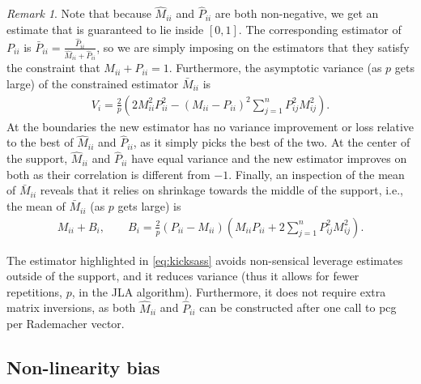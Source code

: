 \documentclass[letterpaper,12pt]{article}
\theoremstyle{remark}
\newtheorem{rem}{Remark}
\theoremstyle{definition}
\theoremstyle{plain}
\begin{document}
\begin{rem}
	Note that because $\hat M_{ii}$ and $\hat P_{ii}$ are both non-negative, we get an estimate that is guaranteed to lie inside $[0,1]$.
	The corresponding estimator of $P_{ii}$ is $\bar P_{ii} = \frac{\hat P_{ii}}{\hat M_{ii} + \hat P_{ii}}$, so we are simply imposing on the estimators that they satisfy the constraint that $M_{ii} + P_{ii} =1$.	Furthermore, the asymptotic variance (as $p$ gets large) of the constrained estimator $\bar M_{ii}$ is 
	\begin{align}
		V_i = \frac{2}{p}\left( 2M_{ii}^2P_{ii}^2 - (M_{ii}-P_{ii})^2\sum_{j=1}^n P_{ij}^2 M_{ij}^2\right).
	\end{align}
	At the boundaries the new estimator has no variance improvement or loss relative to the best of $\hat M_{ii}$ and $\hat P_{ii}$, as it simply picks the best of the two. At the center of the support, $\hat M_{ii}$ and $\hat P_{ii}$ have equal variance and the new estimator improves on both as their correlation is different from $-1$. Finally, an inspection of the mean of $\bar M_{ii}$ reveals that it relies on shrinkage towards the middle of the support, i.e., the mean of $\bar M_{ii}$ (as $p$ gets large) is
	\begin{align}
		M_{ii} + B_{i}, \qquad B_i = \frac{2}{p}\left(P_{ii} - M_{ii}\right)\left( M_{ii}P_{ii} + 2\sum_{j=1}^n P_{ij}^2 M_{ij}^2\right).
	\end{align} 
\end{rem}



The estimator highlighted in \eqref{eq:kicksass} avoids non-sensical leverage estimates outside of the support, and it reduces variance (thus it allows for fewer repetitions, $p$, in the JLA algorithm). Furthermore, it does not require extra matrix inversions, as both $\hat M_{ii}$ and $\hat P_{ii}$ can be constructed after one call to pcg per Rademacher vector.

\subsection*{Non-linearity bias}
\end{document}

